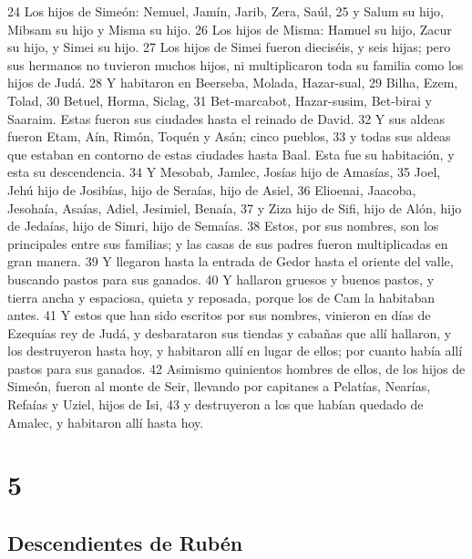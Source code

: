 24 Los hijos de Simeón: Nemuel, Jamín, Jarib, Zera, Saúl,
25 y Salum su hijo, Mibsam su hijo y Misma su hijo.
26 Los hijos de Misma: Hamuel su hijo, Zacur su hijo, y Simei su hijo.
27 Los hijos de Simei fueron dieciséis, y seis hijas; pero sus hermanos no tuvieron muchos hijos, ni multiplicaron toda su familia como los hijos de Judá.
28 Y habitaron en Beerseba, Molada, Hazar-sual,
29 Bilha, Ezem, Tolad,
30 Betuel, Horma, Siclag,
31 Bet-marcabot, Hazar-susim, Bet-birai y Saaraim. Estas fueron sus ciudades hasta el reinado de David.
32 Y sus aldeas fueron Etam, Aín, Rimón, Toquén y Asán; cinco pueblos,
33 y todas sus aldeas que estaban en contorno de estas ciudades hasta Baal. Esta fue su habitación, y esta su descendencia.
34 Y Mesobab, Jamlec, Josías hijo de Amasías,
35 Joel, Jehú hijo de Josibías, hijo de Seraías, hijo de Asiel,
36 Elioenai, Jaacoba, Jesohaía, Asaías, Adiel, Jesimiel, Benaía,
37 y Ziza hijo de Sifi, hijo de Alón, hijo de Jedaías, hijo de Simri, hijo de Semaías.
38 Estos, por sus nombres, son los principales entre sus familias; y las casas de sus padres fueron multiplicadas en gran manera.
39 Y llegaron hasta la entrada de Gedor hasta el oriente del valle, buscando pastos para sus ganados.
40 Y hallaron gruesos y buenos pastos, y tierra ancha y espaciosa, quieta y reposada, porque los de Cam la habitaban antes.
41 Y estos que han sido escritos por sus nombres, vinieron en días de Ezequías rey de Judá, y desbarataron sus tiendas y cabañas que allí hallaron, y los destruyeron hasta hoy, y habitaron allí en lugar de ellos; por cuanto había allí pastos para sus ganados.
42 Asimismo quinientos hombres de ellos, de los hijos de Simeón, fueron al monte de Seir, llevando por capitanes a Pelatías, Nearías, Refaías y Uziel, hijos de Isi,
43 y destruyeron a los que habían quedado de Amalec, y habitaron allí hasta hoy.

\chapter{5}

\section*{Descendientes de Rubén}


